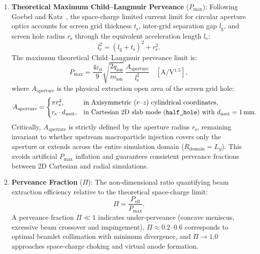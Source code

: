 \documentclass[11pt,a4paper]{article}
\begin{document}
\begin{enumerate}[nosep]
    \item \textbf{Theoretical Maximum Child--Langmuir Perveance} ($P_{\max}$):
    Following Goebel and Katz~\cite{goebel}, the space-charge limited current limit for circular aperture optics accounts for screen grid thickness $t_{\mathrm{s}}$, inter-grid separation gap $l_{\mathrm{g}}$, and screen hole radius $r_{\mathrm{s}}$ through the equivalent acceleration length $l_{\mathrm{e}}$:
    \begin{equation}
        l_{\mathrm{e}}^2 = (l_{\mathrm{g}} + t_{\mathrm{s}})^2 + r_{\mathrm{s}}^2.
    \end{equation}
    The maximum theoretical Child--Langmuir perveance limit is:
    \begin{equation}
        P_{\max} = \frac{4\varepsilon_0}{9} \sqrt{\frac{2 q_{\mathrm{ion}}}{m_{\mathrm{ion}}}} \, \frac{A_{\mathrm{aperture}}}{l_{\mathrm{e}}^2} \quad \left[\si{\ampere\per\volt^{1.5}}\right],
    \end{equation}
    where $A_{\mathrm{aperture}}$ is the physical extraction open area of the screen grid hole:
    \begin{equation}
        A_{\mathrm{aperture}} =
        \begin{cases}
            \pi r_{\mathrm{s}}^2, & \text{in Axisymmetric ($r\text{--}z$) cylindrical coordinates}, \\
            r_{\mathrm{s}} \cdot d_{\mathrm{unit}}, & \text{in Cartesian 2D slab mode (\texttt{half\_hole}) with } d_{\mathrm{unit}} = \SI{1}{\milli\meter}.
        \end{cases}
    \end{equation}
    Critically, $A_{\mathrm{aperture}}$ is strictly defined by the aperture radius $r_{\mathrm{s}}$, remaining invariant to whether upstream macroparticle injection covers only the aperture or extends across the entire simulation domain ($R_{\mathrm{domain}} = L_y$). This avoids artificial $P_{\max}$ inflation and guarantees consistent perveance fractions between 2D Cartesian and radial simulations.
    
    \item \textbf{Perveance Fraction} ($\Pi$):
    The non-dimensional ratio quantifying beam extraction efficiency relative to the theoretical space-charge limit:
    \begin{equation}
        \Pi = \frac{P_{\mathrm{eff}}}{P_{\max}}.
    \end{equation}
    A perveance fraction $\Pi \ll 1$ indicates under-perveance (concave meniscus, excessive beam crossover and impingement), $\Pi \approx 0.2\text{--}0.6$ corresponds to optimal beamlet collimation with minimum divergence, and $\Pi \to 1.0$ approaches space-charge choking and virtual anode formation.
\end{enumerate}
\end{document}
